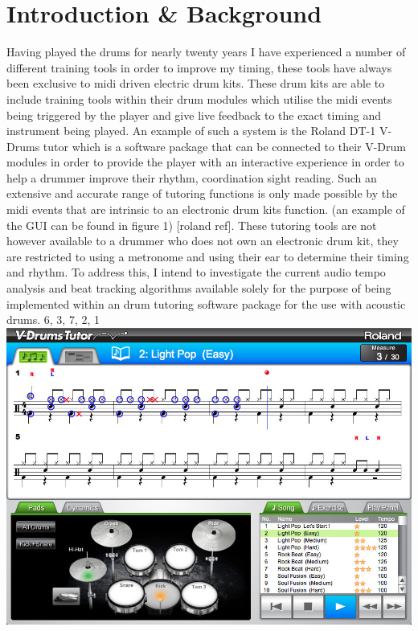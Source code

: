 \documentclass[a4paper, 11pt]{article}
\begin{document}
 

\maketitle
\newpage
\tableofcontents
\clearpage

\maketitle{} \section{Introduction \& Background}
Having played the drums for nearly twenty years I have experienced a number of different training tools in order to improve my timing, these tools have always been exclusive to midi driven electric drum kits. These drum kits are able to include training tools within their drum modules which utilise the midi events being triggered by the player and give live feedback to the exact timing and instrument being played. An example of such a system is the Roland DT-1 V-Drums tutor which is a software package that can be connected to their V-Drum modules in order to provide the player with an interactive experience in order to help a drummer improve their rhythm, coordination sight reading. Such an extensive and accurate range of tutoring functions is only made possible by the midi events that are intrinsic to an electronic drum kits function. (an example of the GUI can be found in figure 1) [roland ref]. These tutoring tools are not however available to a drummer who does not own an electronic drum kit, they are restricted to using a metronome and using their ear to determine their timing and rhythm. To address this, I intend to investigate the current audio tempo analysis and beat tracking algorithms available solely for the purpose of being implemented within an drum tutoring software package for the use with acoustic drums.
6, 3, 7, 2, 1
\includegraphics[scale=0.2]{dt-1_ss_main_notation_gal} 
\end{document}
